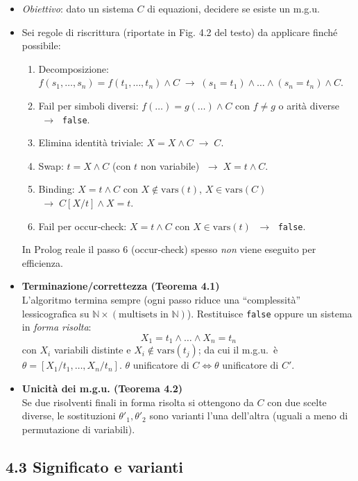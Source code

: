\documentclass[12pt]{article}
\begin{document}
\begin{itemize}
  \item \emph{Obiettivo}: dato un sistema $C$ di equazioni, decidere se esiste un m.g.u.
  \item Sei regole di riscrittura (riportate in Fig. 4.2 del testo) da applicare finché possibile:
    \begin{enumerate}
      \item Decomposizione: $f(s_1,\dots,s_n)=f(t_1,\dots,t_n) \land C \;\to\; (s_1 = t_1) \land \dots \land (s_n = t_n) \land C$.
      \item Fail per simboli diversi: $f(\dots)=g(\dots)\land C$ con $f \neq g$ o arità diverse $\;\to\;$ \texttt{false}.
      \item Elimina identità triviale: $X = X \land C \;\to\; C$.
      \item Swap: $t = X \land C$ (con $t$ non variabile) $\;\to\; X = t \land C$.
      \item Binding: $X = t \land C$ con $X \notin \mathrm{vars}(t)$, $X \in \mathrm{vars}(C)$ $\;\to\; C[X/t] \land X = t$.
      \item Fail per occur‐check: $X = t \land C$ con $X \in \mathrm{vars}(t)$ $\;\to\;$ \texttt{false}.
    \end{enumerate}
    In Prolog reale il passo 6 (occur‐check) spesso \emph{non} viene eseguito per efficienza.

  \item \textbf{Terminazione/correttezza (Teorema 4.1)}\\
    L’algoritmo termina sempre (ogni passo riduce una “complessità” lessicografica su $\mathbb{N}\times(\text{multisets in }\mathbb{N})$). Restituisce \texttt{false} oppure un sistema in \emph{forma risolta}:
    \[
      X_1 = t_1 \land \dots \land X_n = t_n
    \]
    con $X_i$ variabili distinte e $X_i \notin \mathrm{vars}(t_j)$; da cui il m.g.u.\ è $\theta = [X_1/t_1, \dots, X_n/t_n]$. $\theta$ unificatore di $C \iff \theta$ unificatore di $C'$.

  \item \textbf{Unicità dei m.g.u. (Teorema 4.2)}\\
    Se due risolventi finali in forma risolta si ottengono da $C$ con due scelte diverse, le sostituzioni $\theta'_1, \theta'_2$ sono varianti l’una dell’altra (uguali a meno di permutazione di variabili).
\end{itemize}

\subsection*{4.3 Significato e varianti}
\end{document}
